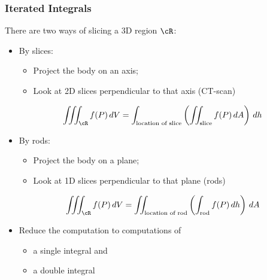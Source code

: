 \begin{frame}
  \frametitle{Iterated Integrals}

  There are two ways of slicing a 3D region $\cR$:
  \begin{itemize}
    \item By slices:
    \begin{itemize}
      \item Project the body on an axis;
      \item Look at 2D slices perpendicular to that axis (CT-scan)
    \end{itemize}
      $$\iiint_{\cR}f(P) \, dV = \int_{\text{location of slice}} \left(\iint_{\text{slice}} f(P) \, dA\right) \, dh$$
      \item By rods:
      \begin{itemize}
        \item Project the body on a plane;
        \item Look at 1D slices perpendicular to that plane (rods)
      \end{itemize}
      $$\iiint_{\cR}f(P) \, dV = \iint_{\text{location of rod}} \left(\int_{\text{rod}} f(P) \, dh\right) \, dA$$
  \end{itemize}
  \begin{itemize}
    \item Reduce the computation to computations of
    \begin{itemize}
      \item  a single integral and
      \item a double integral
    \end{itemize}
  \end{itemize}
\end{frame}